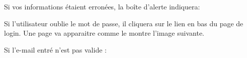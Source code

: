 \documentclass{article}
\begin{document}
\begin{enumerate}
Si vos informations étaient erronées, la boîte d'alerte indiquera:

\vspace{0.4cm}
   
\hspace*{-0.7in}

               \noindent{}

\vspace{3.4cm}
	Si l'utilisateur oublie le mot de passe, il cliquera sur le lien en bas du page de login. Une page va apparaitre comme le montre l'image suivante.

\vspace{0.4cm}
\hspace*{-0.7in}
               \noindent{}


Si l'e-mail entré n'est pas valide :


\vspace{0.4cm}
\hspace*{-0.7in}
               \noindent{}




\end{enumerate}
\end{document}
